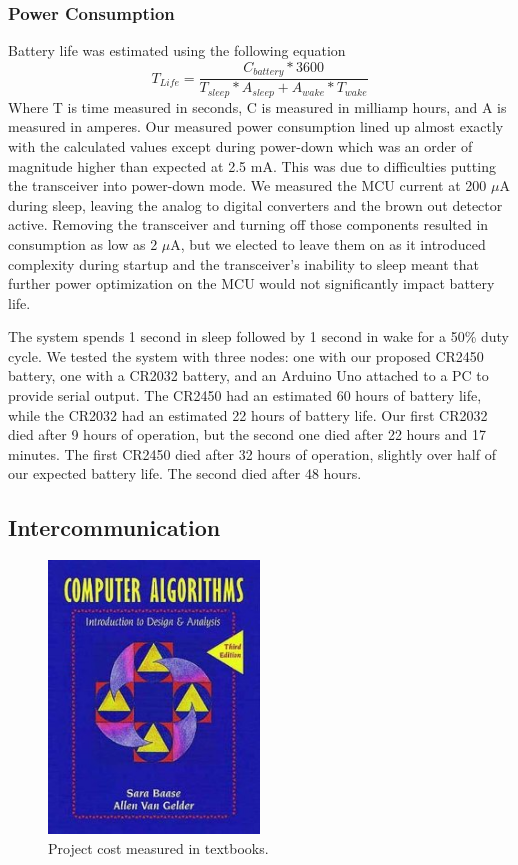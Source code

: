 \subsubsection{Power Consumption}
Battery life was estimated using the following equation
\[T_{Life}=\frac{C_{battery} * 3600}{T_{sleep}*A_{sleep} + A_{wake}*T_{wake}}\] Where T is time measured in seconds, C is measured in milliamp hours, and A is measured in amperes.
Our measured power consumption lined up almost exactly with the calculated values except during power-down which was an order of magnitude higher than expected at 2.5 mA. This was due to difficulties putting the transceiver into power-down mode. We measured the MCU current at 200 $\mu$A during sleep, leaving the analog to digital converters and the brown out detector active. Removing the transceiver and turning off those components resulted in consumption as low as 2 $\mu$A, but we elected to leave them on as it introduced complexity during startup and the transceiver's inability to sleep meant that further power optimization on the MCU would not significantly impact battery life.

The system spends 1 second in sleep followed by 1 second in wake for a 50\% duty cycle. We tested the system with three nodes: one with our proposed CR2450 battery, one with a CR2032 battery, and an Arduino Uno attached to a PC to provide serial output. The CR2450 had an estimated 60 hours of battery life, while the CR2032 had an estimated 22 hours of battery life. Our first CR2032 died after 9 hours of operation, but the second one died after 22 hours and 17 minutes.
The first CR2450 died after 32 hours of operation, slightly over half of our expected battery life. The second died after 48 hours.

\subsection{Intercommunication}

\begin{figure}[h!]
  \centering
  \includegraphics[width=0.5\textwidth]{images/textbook.png}
  \caption{Project cost measured in textbooks.
  \label{img:flowchart}
  }
\end{figure}

